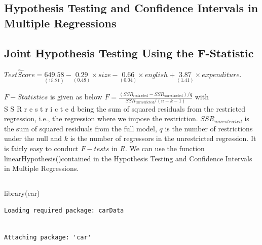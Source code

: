 \documentclass[
  letterpaper,
  DIV=11,
  numbers=noendperiod]{scrartcl}
\newenvironment{Shaded}{\begin{snugshade}}{\end{snugshade}}
\newcommand{\FunctionTok}[1]{\textcolor[rgb]{0.53,0.75,0.82}{#1}}
\newcommand{\NormalTok}[1]{\textcolor[rgb]{0.85,0.87,0.91}{#1}}
\begin{document}
\hypertarget{hypothesis-testing-and-confidence-intervals-in-multiple-regressions}{%
\subsection{Hypothesis Testing and Confidence Intervals in Multiple
Regressions}\label{hypothesis-testing-and-confidence-intervals-in-multiple-regressions}}

\hypertarget{joint-hypothesis-testing-using-the-f-statistic}{%
\subsection{Joint Hypothesis Testing Using the
F-Statistic}\label{joint-hypothesis-testing-using-the-f-statistic}}

\(\widehat{TestScore} = \underset{(15.21)}{649.58} -\underset{(0.48)}{0.29} \times size - \underset{(0.04)}{0.66} \times english + \underset{(1.41)}{3.87} \times expenditure.\)

\(F-Statistics\) is given as below
\(F = \frac{(SSR_{\text{restricted}} - SSR_{\text{unrestricted}})/q}{SSR_{\text{unrestricted}} / (n-k-1)}\)
with\\
S S R r e s t r i c t e d being the sum of squared residuals from the
restricted regression, i.e., the regression where we impose the
restriction. \(SSR_{unrestricted}\) is the sum of squared residuals from
the full model, \(q\) is the number of restrictions under the null and
\(k\) is the number of regressors in the unrestricted regression. It is
fairly easy to conduct \(F-tests\) in \(R\). We can use the function
linearHypothesis()contained in the Hypothesis Testing and Confidence
Intervals in Multiple Regressions.

\hypertarget{section-13}{%
\subsection{}\label{section-13}}

\begin{Shaded}
\begin{Highlighting}[]
\FunctionTok{library}\NormalTok{(car)}
\end{Highlighting}
\end{Shaded}

\begin{verbatim}
Loading required package: carData
\end{verbatim}

\begin{verbatim}

Attaching package: 'car'
\end{verbatim}
\end{document}
